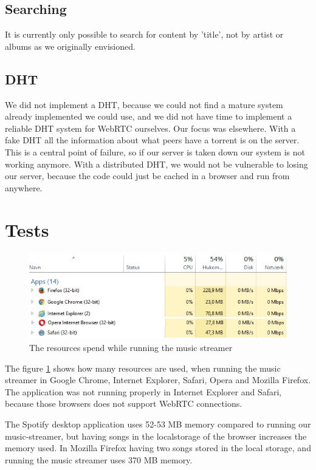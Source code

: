 \subsection{Searching}
It is currently only possible to search for content by 'title', not by artist
or albums as we originally envisioned.

\subsection{DHT}
We did not implement a DHT, 
because we could not find a mature system already implemented we could use, 
and we did not have time to implement a reliable DHT system for WebRTC ourselves.
Our focus was elsewhere.
With a fake \acs{DHT} all the information about what peers have a torrent is on the server. 
This is a central point of failure, so if our server is taken down our system is not working anymore.
With a distributed \acs{DHT}, 
we would not be vulnerable to losing our server, 
because the code could just be cached in a browser and run from anywhere.

\section{Tests}
\begin{figure}[H]
	\centering
	\includegraphics[width=\linewidth]{gfx/streamerIdle}
	\caption{The resources spend while running the music streamer}
	\label{fig:streamer-idle}
\end{figure}

The figure \ref{fig:streamer-idle} shows how many resources are used,
when running the music streamer in Google Chrome, Internet Explorer, Safari, Opera and Mozilla Firefox.
The application was not running properly in Internet Explorer and Safari, because those browsers does not support WebRTC connections.

The Spotify desktop application uses 52-53 MB memory compared to running our music-streamer,
but having songs in the localstorage of the browser increases the memory used. 
In Mozilla Firefox having two songs stored in the local storage,
and running the music streamer uses 370 MB memory.

